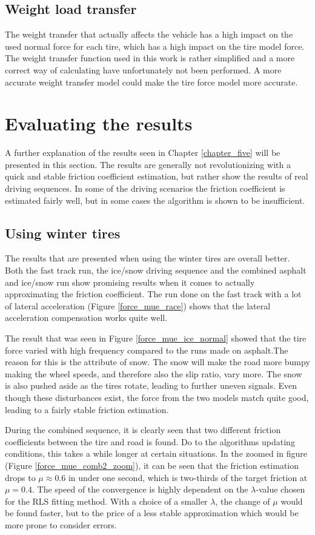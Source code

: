 \subsection{Weight load transfer}
The weight transfer that actually affects the vehicle has a high impact on the used normal force for each tire, which has a high impact on the tire model force. The weight transfer function used in this work is rather simplified and a more correct way of calculating have unfortunately not been performed. A more accurate weight transfer model could make the tire force model more accurate.   

\section{Evaluating the results}
A further explanation of the results seen in Chapter \ref{chapter_five} will be presented in this section. The results are generally not revolutionizing with a quick and stable friction coefficient estimation, but rather show the results of real driving sequences. In some of the driving scenarios the friction coefficient is estimated fairly well, but in some cases the algorithm is shown to be insufficient. 

\subsection{Using winter tires}
The results that are presented when using the winter tires are overall better. Both the fast track run, the ice/snow driving sequence and the combined asphalt and ice/snow run show promising results when it comes to actually approximating the friction coefficient. The run done on the fast track with a lot of lateral acceleration (Figure \ref{force_mue_race}) shows that the lateral acceleration compensation works quite well.

The result that was seen in Figure \ref{force_mue_ice_normal} showed that the tire force varied with high frequency compared to the runs made on asphalt.The reason for this is the attribute of snow. The snow will make the road more bumpy making the wheel speeds, and therefore also the slip ratio, vary more. The snow is also pushed aside as the tires rotate, leading to further uneven signals. Even though these disturbances exist, the force from the two models match quite good, leading to a fairly stable friction estimation. 

During the combined sequence, it is clearly seen that two different friction coefficients between the tire and road is found. Do to the algorithms updating conditions, this takes a while longer at certain situations. In the zoomed in figure (Figure \ref{force_mue_comb2_zoom}), it can be seen that the friction estimation drops to $ \mu \approx 0.6 $ in under one second, which is two-thirds of the target friction at $ \mu = 0.4 $. The speed of the convergence is highly dependent on the $ \lambda $-value chosen for the RLS fitting method. With a choice of a smaller $ \lambda $, the change of $ \mu $ would be found faster, but to the price of a less stable approximation which would be more prone to consider errors. 

